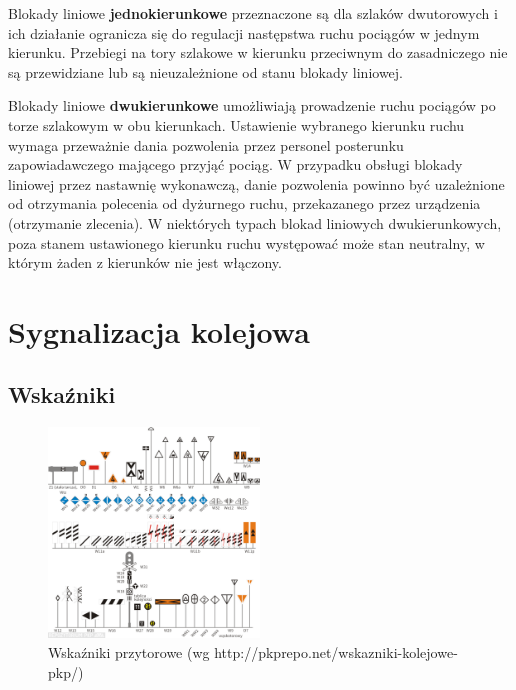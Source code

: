 Blokady liniowe \textbf{jednokierunkowe} przeznaczone są dla szlaków dwutorowych i ich działanie ogranicza się do regulacji następstwa ruchu pociągów w jednym kierunku. Przebiegi na tory szlakowe w kierunku przeciwnym do zasadniczego nie są przewidziane lub są nieuzależnione od stanu blokady liniowej.

Blokady liniowe \textbf{dwukierunkowe} umożliwiają prowadzenie ruchu pociągów po torze szlakowym w obu kierunkach. Ustawienie wybranego kierunku ruchu wymaga przeważnie dania pozwolenia przez personel posterunku zapowiadawczego mającego przyjąć pociąg. W przypadku obsługi blokady liniowej przez nastawnię wykonawczą, danie pozwolenia powinno być uzależnione od otrzymania polecenia od dyżurnego ruchu, przekazanego przez urządzenia (otrzymanie zlecenia). W niektórych typach blokad liniowych dwukierunkowych, poza stanem ustawionego kierunku ruchu występować może stan neutralny, w którym żaden z kierunków nie jest włączony.

 


\chapter{Sygnalizacja kolejowa}

\section{Wskaźniki}

\begin{center}
	\begin{figure}
		\includegraphics[width=0.5\textwidth]{skryptkierownik-img/skryptkierownik-img003.png}
		\caption{Wskaźniki przytorowe (wg http://pkprepo.net/wskazniki-kolejowe-pkp/)}
		\label{fig:wskazniki}
	\end{figure}
\end{center}

